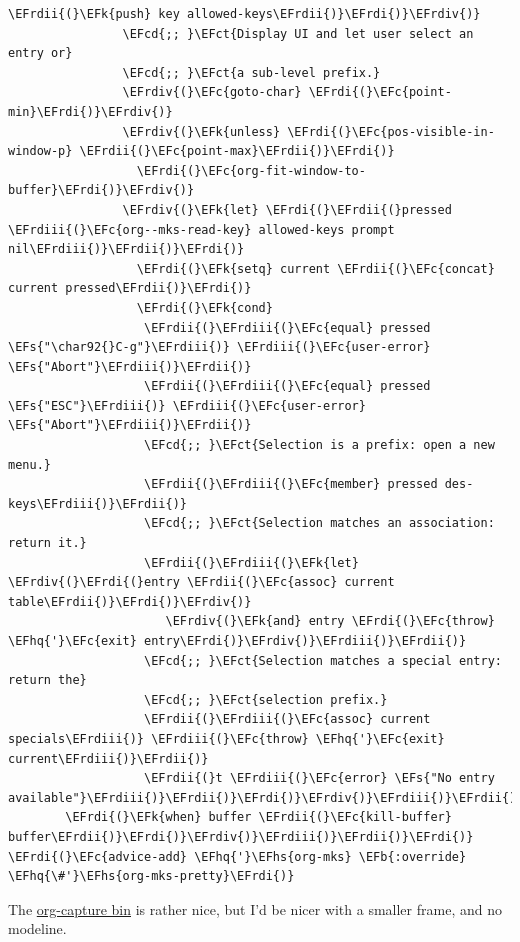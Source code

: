 \documentclass{scrartcl}
\newcommand{\EFk}[1]{\textcolor{EFk}{#1}} %
\newcommand{\EFs}[1]{\textcolor{EFs}{#1}} %
\newcommand{\EFb}[1]{\textcolor{EFb}{#1}} %
\newcommand{\EFct}[1]{\textcolor{EFct}{#1}} %
\newcommand{\EFc}[1]{\textcolor{EFc}{#1}} %
\newcommand{\EFcd}[1]{\textcolor{EFcd}{#1}} %
\newcommand{\EFhq}[1]{#1} %
\newcommand{\EFhs}[1]{#1} %
\newcommand{\EFrdi}[1]{#1} %
\newcommand{\EFrdii}[1]{#1} %
\newcommand{\EFrdiii}[1]{#1} %
\newcommand{\EFrdiv}[1]{#1} %
\begin{document}
\begin{Code}
\begin{Verbatim}[]
                    \EFrdii{(}\EFk{push} key allowed-keys\EFrdii{)}\EFrdi{)}\EFrdiv{)}
                \EFcd{;; }\EFct{Display UI and let user select an entry or}
                \EFcd{;; }\EFct{a sub-level prefix.}
                \EFrdiv{(}\EFc{goto-char} \EFrdi{(}\EFc{point-min}\EFrdi{)}\EFrdiv{)}
                \EFrdiv{(}\EFk{unless} \EFrdi{(}\EFc{pos-visible-in-window-p} \EFrdii{(}\EFc{point-max}\EFrdii{)}\EFrdi{)}
                  \EFrdi{(}\EFc{org-fit-window-to-buffer}\EFrdi{)}\EFrdiv{)}
                \EFrdiv{(}\EFk{let} \EFrdi{(}\EFrdii{(}pressed \EFrdiii{(}\EFc{org--mks-read-key} allowed-keys prompt nil\EFrdiii{)}\EFrdii{)}\EFrdi{)}
                  \EFrdi{(}\EFk{setq} current \EFrdii{(}\EFc{concat} current pressed\EFrdii{)}\EFrdi{)}
                  \EFrdi{(}\EFk{cond}
                   \EFrdii{(}\EFrdiii{(}\EFc{equal} pressed \EFs{"\char92{}C-g"}\EFrdiii{)} \EFrdiii{(}\EFc{user-error} \EFs{"Abort"}\EFrdiii{)}\EFrdii{)}
                   \EFrdii{(}\EFrdiii{(}\EFc{equal} pressed \EFs{"ESC"}\EFrdiii{)} \EFrdiii{(}\EFc{user-error} \EFs{"Abort"}\EFrdiii{)}\EFrdii{)}
                   \EFcd{;; }\EFct{Selection is a prefix: open a new menu.}
                   \EFrdii{(}\EFrdiii{(}\EFc{member} pressed des-keys\EFrdiii{)}\EFrdii{)}
                   \EFcd{;; }\EFct{Selection matches an association: return it.}
                   \EFrdii{(}\EFrdiii{(}\EFk{let} \EFrdiv{(}\EFrdi{(}entry \EFrdii{(}\EFc{assoc} current table\EFrdii{)}\EFrdi{)}\EFrdiv{)}
                      \EFrdiv{(}\EFk{and} entry \EFrdi{(}\EFc{throw} \EFhq{'}\EFc{exit} entry\EFrdi{)}\EFrdiv{)}\EFrdiii{)}\EFrdii{)}
                   \EFcd{;; }\EFct{Selection matches a special entry: return the}
                   \EFcd{;; }\EFct{selection prefix.}
                   \EFrdii{(}\EFrdiii{(}\EFc{assoc} current specials\EFrdiii{)} \EFrdiii{(}\EFc{throw} \EFhq{'}\EFc{exit} current\EFrdiii{)}\EFrdii{)}
                   \EFrdii{(}t \EFrdiii{(}\EFc{error} \EFs{"No entry available"}\EFrdiii{)}\EFrdii{)}\EFrdi{)}\EFrdiv{)}\EFrdiii{)}\EFrdii{)}\EFrdi{)}
        \EFrdi{(}\EFk{when} buffer \EFrdii{(}\EFc{kill-buffer} buffer\EFrdii{)}\EFrdi{)}\EFrdiv{)}\EFrdiii{)}\EFrdii{)}\EFrdi{)}
\EFrdi{(}\EFc{advice-add} \EFhq{'}\EFhs{org-mks} \EFb{:override} \EFhq{\#'}\EFhs{org-mks-pretty}\EFrdi{)}
\end{Verbatim}
\end{Code}

The \href{file:///Users/shauryasingh/.emacs.doom/bin/org-capture}{org-capture bin} is rather nice, but I'd be nicer with a smaller frame, and
no modeline.
\end{document}
